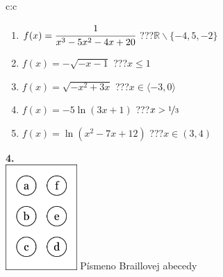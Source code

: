 \documentclass[10pt]{report}
\begin{document}
\begin{tabular}{c:c}
\begin{minipage}[c][104.5mm][t]{0.5\linewidth}
\begin{center}
\begin{minipage}{0.79\linewidth}
\begin{center}
\begin{varwidth}{\linewidth}
\begin{enumerate}
\item $f(x)=\cfrac{1}{x^3-5x^2-4x+20}$\quad \dotfill\; ???\;\dotfill \quad $\mathbb{R}\smallsetminus\{-4,5,-2\}$
\item $f(x)=-\sqrt{-x-1}$\quad \dotfill\; ???\;\dotfill \quad $x\leq1$
\item $f(x)=\sqrt{-x^2+3x}$\quad \dotfill\; ???\;\dotfill \quad $x\in\langle-3 , 0\rangle$
\item $f(x)=-5\ln{(3x+1)}$\quad \dotfill\; ???\;\dotfill \quad $x>\nicefrac{1}{3}$
\item $f(x)=\ln{(x^2-7x+12)}$\quad \dotfill\; ???\;\dotfill \quad $x\in(3 , 4)$
\end{enumerate}
\end{varwidth}
\end{center}
\end{minipage}
\begin{minipage}{0.20\linewidth}
\begin{center}
{\Huge\bfseries 4.} \\[2mm]
\includegraphics[height=40mm]{../images/braille.png}
{\small Písmeno Braillovej abecedy}
\end{center}
\end{minipage}
\end{center}
\end{minipage}
%
\end{tabular}
\newpage
\end{document}
